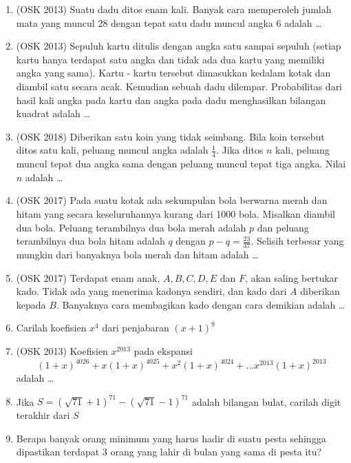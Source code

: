 \documentclass[11pt]{scrartcl}
\begin{document}
\begin{enumerate}
            \item (OSK 2013) Suatu dadu ditos enam kali. Banyak cara memperoleh jumlah mata yang muncul 28 dengan tepat satu dadu muncul angka 6 adalah \dots
            
            \item (OSK 2013) Sepuluh kartu ditulis dengan angka satu sampai sepuluh (setiap kartu hanya terdapat satu angka dan tidak ada dua kartu yang memiliki angka yang sama). Kartu - kartu tersebut dimasukkan kedalam kotak dan diambil satu secara acak. Kemudian sebuah dadu dilempar. Probabilitas dari hasil kali angka pada kartu dan angka pada dadu menghasilkan bilangan kuadrat adalah \dots
            
            \item (OSK 2018) Diberikan satu koin yang tidak seimbang. Bila koin tersebut ditos satu kali, peluang muncul angka adalah $\frac{1}{4}$. Jika ditos $n$ kali, peluang muncul tepat dua angka sama dengan peluang muncul tepat tiga angka. Nilai $n$ adalah \dots
            
            \item (OSK 2017) Pada suatu kotak ada sekumpulan bola berwarna merah dan hitam yang secara keseluruhannya kurang dari 1000 bola. Misalkan diambil dua bola. Peluang terambilnya dua bola merah adalah $p$ dan peluang terambilnya dua bola hitam adalah $q$ dengan $p-q =\frac{23}{37}$. Selisih terbesar yang mungkin dari banyaknya bola merah dan hitam adalah \dots
            
            \item (OSK 2017) Terdapat enam anak, $A, B, C, D, E$ dan $F$, akan saling bertukar kado. Tidak ada yang menerima kadonya sendiri, dan kado dari $A$ diberikan kepada $B$. Banyaknya cara membagikan kado dengan cara demikian adalah \dots
            
             \item Carilah koefisien $x^4$ dari penjabaran $(x+1)^9$
                
                \item (OSK 2013) Koefisien $x^{2013}$ pada ekspansi
                $$(1+x)^{4026}+x(1+x)^{4025}+x^2(1+x)^{4024}+\dots x^{2013}(1+x)^{2013}$$
                adalah \dots
                
                \item Jika $S=(\sqrt{71}+1)^{71}-(\sqrt{71}-1)^{71}$ adalah bilangan bulat, carilah digit terakhir dari $S$
                \item Berapa banyak orang minimum yang harus hadir di suatu pesta sehingga dipastikan terdapat 3 orang yang lahir di bulan yang sama di pesta itu?
                

\end{enumerate}
\end{document}
